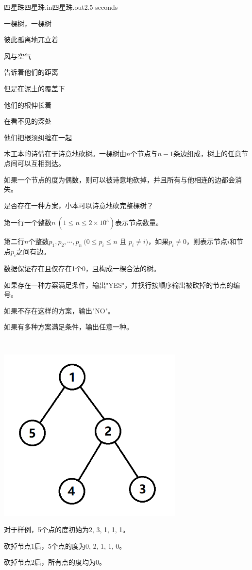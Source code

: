 \begin{problem}{四星珠}{四星珠.in}{四星珠.out}{2.5 seconds}


一棵树，一棵树

彼此孤离地兀立着

风与空气

告诉着他们的距离

但是在泥土的覆盖下

他们的根伸长着

在看不见的深处

他们把根须纠缠在一起

木工本的诗情在于诗意地砍树。一棵树由$n$个节点与$n-1$条边组成，树上的任意节点间可以互相到达。

如果一个节点的度为偶数，则可以被诗意地砍掉，并且所有与他相连的边都会消失。

是否存在一种方案，小本可以诗意地砍完整棵树？

\InputFile

第一行一个整数$n\ (1\le n\le 2\times 10^5)$表示节点数量。

第二行$n$个整数$p_1,p_2,\cdots,p_n\ (0\le p_i\le n$ 且 $p_i\ne i)$，如果$p_i\ne 0$，则表示节点$i$和节点$p_i$之间有边。

数据保证存在且仅存在1个0，且构成一棵合法的树。

\OutputFile

如果存在一种方案满足条件，输出"YES"，并换行按顺序输出被砍掉的节点的编号。

如果不存在这样的方案，输出"NO"。

如果有多种方案满足条件，输出任意一种。

\Example

\begin{example}
%
\end{example}
\\
\begin{minipage}[b]{0.3\linewidth}
\includegraphics[width=0.7\textwidth]{pics/D.png}
\end{minipage}
\hfill
\begin{minipage}[b]{0.7\linewidth}

对于样例，5个点的度初始为2, 3, 1, 1, 1。

砍掉节点1后，5个点的度为0, 2, 1, 1, 0。

砍掉节点2后，所有点的度均为0。
\end{minipage}
\end{problem}
